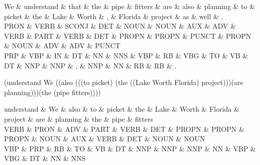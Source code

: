 
\begin{dependency}
\begin{deptext}
We \& understand \& that \& the \& pipe \& fitters \& are \& also \& planning \& to \& picket \& the \& Lake \& Worth \& , \& Florida \& project \& as \& well \& . \\
PRON \& VERB \& SCONJ \& DET \& NOUN \& NOUN \& AUX \& ADV \& VERB \& PART \& VERB \& DET \& PROPN \& PROPN \& PUNCT \& PROPN \& NOUN \& ADV \& ADV \& PUNCT \\
PRP \& VBP \& IN \& DT \& NN \& NNS \& VBP \& RB \& VBG \& TO \& VB \& DT \& NNP \& NNP \& , \& NNP \& NN \& RB \& RB \& . \\
\end{deptext}



\end{dependency}

(understand We ((also (((to picket) 
(the ((Lake Worth Florida) project)))(are planning)))(the (pipe fitters))))

\begin{dependency}
\begin{deptext}
understand \& We \& also \& to \& picket \& the \& Lake \& Worth \& Florida \& project \& are \& planning \& the \& pipe \& fitters \\
VERB \& PRON \& ADV \& PART \& VERB \& DET \& PROPN \& PROPN \& PROPN \& NOUN \& AUX \& VERB \& DET \& NOUN \& NOUN \\
VBP \& PRP \& RB \& TO \& VB \& DT \& NNP \& NNP \& NNP \& NN \& VBP \& VBG \& DT \& NN \& NNS \\
\end{deptext}



\end{dependency}
